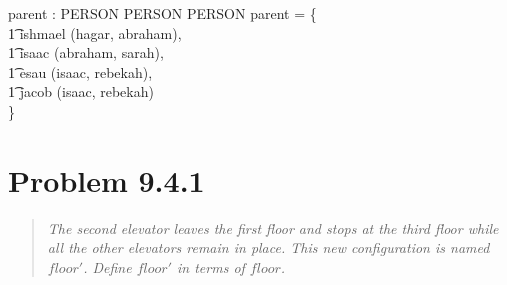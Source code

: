 \documentclass[10pt]{article}
\begin{document}
\begin{axdef}
  parent : PERSON \rel PERSON \cross PERSON
  \where
  parent = \{ \\
  \t1 ishmael \mapsto (hagar, abraham), \\
  \t1 isaac \mapsto (abraham, sarah), \\
  \t1 esau \mapsto (isaac, rebekah), \\
  \t1 jacob \mapsto (isaac, rebekah) \\
  \}
\end{axdef}

\section{Problem 9.4.1}
\begin{quote}
  {\it The second elevator leaves the first floor and stops at the third floor while all the other
    elevators remain in place.  This new configuration is named $floor'$.  Define $floor'$ in terms
    of $floor$.}

\end{quote}
\end{document}
